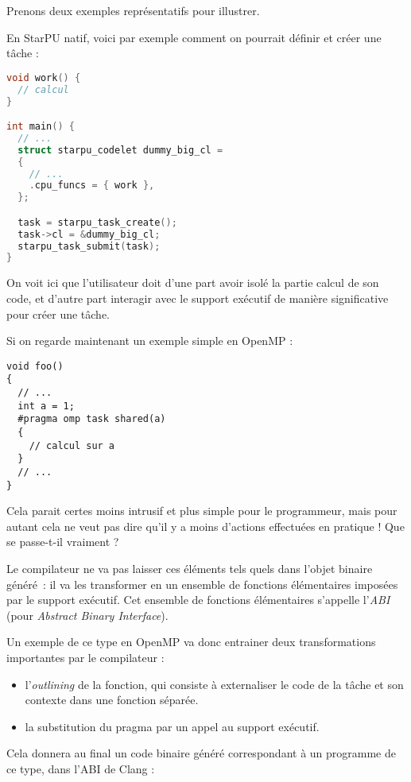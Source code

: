 Prenons deux exemples représentatifs pour illustrer.

En StarPU natif, voici par exemple comment on pourrait définir et créer une tâche :

\begin{lstlisting}[language=c++,caption=Exemple simple en StarPU,label=lst:context:simple-starpu]
void work() {
  // calcul
}

int main() {
  // ...
  struct starpu_codelet dummy_big_cl =
  {
    // ...
    .cpu_funcs = { work },
  };

  task = starpu_task_create();
  task->cl = &dummy_big_cl;
  starpu_task_submit(task);
}
\end{lstlisting}

On voit ici que l'utilisateur doit d'une part avoir isolé la partie calcul de son code, et d'autre part interagir avec le support exécutif de manière significative pour créer une tâche.

Si on regarde maintenant un exemple simple en OpenMP :

\begin{lstlisting}
void foo()
{
  // ...
  int a = 1;
  #pragma omp task shared(a)
  {
    // calcul sur a
  }
  // ...
}
\end{lstlisting}

Cela parait certes moins intrusif et plus simple pour le programmeur, mais pour autant cela ne veut pas dire qu'il y a moins d'actions effectuées en pratique !
Que se passe-t-il vraiment ?

Le compilateur ne va pas laisser ces éléments tels quels dans l'objet binaire généré~: il va les transformer en un ensemble de fonctions élémentaires imposées par le support exécutif. Cet ensemble de fonctions élémentaires s'appelle l'\emph{ABI} (pour \emph{Abstract Binary Interface}).

Un exemple de ce type en OpenMP va donc entrainer deux transformations importantes par le compilateur :
\begin{itemize}
  \item l'\emph{outlining} de la fonction, qui consiste à externaliser le code de la tâche et son contexte dans une fonction séparée.
  \item la substitution du pragma par un appel au support exécutif.
\end{itemize}

Cela donnera au final un code binaire généré correspondant à un programme de ce type, dans l'ABI de Clang :

